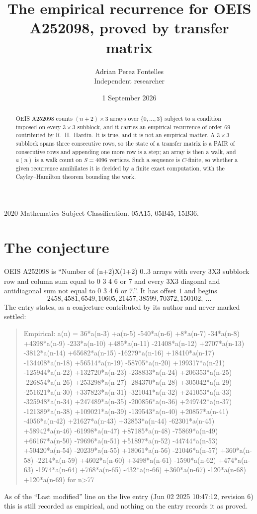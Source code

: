 \documentclass[11pt,a4paper]{article}
\title{The empirical recurrence for OEIS A252098, proved by transfer matrix}
\author{Adrian Perez Fontelles\\ \small Independent researcher}
\date{1 September 2026}
\theoremstyle{plain}
\theoremstyle{definition}
\begin{document}
\maketitle

\begin{abstract}
OEIS A252098 counts $(n+2)\times3$ arrays over $\{0,\dots,3\}$ subject to a condition imposed on
every $3\times3$ subblock, and it carries an empirical recurrence of order $69$
contributed by R.~H.~Hardin. It is true, and it is not an empirical matter. A $3\times3$
subblock spans three consecutive rows, so the state of a transfer matrix is a PAIR of
consecutive rows and appending one more row is a step; an array is then a walk, and
$a(n)$ is a walk count on $S=4096$ vertices. Such a sequence is $C$-finite, so whether a given
recurrence annihilates it is decided by a finite exact computation, with the Cayley--Hamilton
theorem bounding the work.
\end{abstract}

\noindent\small 2020 Mathematics Subject Classification. 05A15, 05B45, 15B36.\normalsize

\section{The conjecture}

OEIS A252098 is ``Number of (n+2)X(1+2) 0..3 arrays with every 3X3 subblock row and column sum equal to 0 3 4 6 or 7 and every 3X3 diagonal and antidiagonal sum not equal to 0 3 4 6 or 7.''. It has offset $1$ and begins
\[
2458, 4581, 6549, 10605, 21457, 38599, 70372, 150102,\ \dots
\]
The entry states, as a conjecture contributed by its author and never marked settled:
\begin{quote}
Empirical: a(n) = 36*a(n-3) +a(n-5) -540*a(n-6) +8*a(n-7) -34*a(n-8) +4398*a(n-9) -233*a(n-10) +485*a(n-11) -21408*a(n-12) +2707*a(n-13) -3812*a(n-14) +65682*a(n-15) -16279*a(n-16) +18410*a(n-17) -134408*a(n-18) +56514*a(n-19) -58705*a(n-20) +199317*a(n-21) -125944*a(n-22) +132720*a(n-23) -238833*a(n-24) +206353*a(n-25) -226854*a(n-26) +253298*a(n-27) -284370*a(n-28) +305042*a(n-29) -251621*a(n-30) +337823*a(n-31) -321041*a(n-32) +241053*a(n-33) -325948*a(n-34) +247489*a(n-35) -200856*a(n-36) +249742*a(n-37) -121389*a(n-38) +109021*a(n-39) -139543*a(n-40) +20857*a(n-41) -4056*a(n-42) +21627*a(n-43) +32853*a(n-44) -62301*a(n-45) +58942*a(n-46) -61998*a(n-47) +87185*a(n-48) -75869*a(n-49) +66167*a(n-50) -79696*a(n-51) +51897*a(n-52) -44744*a(n-53) +50420*a(n-54) -20239*a(n-55) +18061*a(n-56) -21046*a(n-57) +360*a(n-58) -2214*a(n-59) +4602*a(n-60) +3498*a(n-61) -1590*a(n-62) +474*a(n-63) -1974*a(n-64) +768*a(n-65) -432*a(n-66) +360*a(n-67) -120*a(n-68) +120*a(n-69) for n>77
\end{quote}
As of the ``Last modified'' line on the live entry (Jun 02 2025 10:47:12, revision 6) this is still
recorded as empirical, and nothing on the entry records it as proved.
\end{document}
